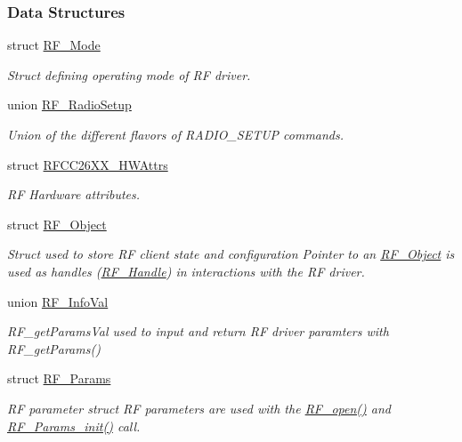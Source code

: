 \subsubsection*{Data Structures}
\begin{DoxyCompactItemize}
\item 
struct \hyperlink{struct_r_f___mode}{R\+F\+\_\+\+Mode}
\begin{DoxyCompactList}\small\item\em Struct defining operating mode of R\+F driver. \end{DoxyCompactList}\item 
union \hyperlink{union_r_f___radio_setup}{R\+F\+\_\+\+Radio\+Setup}
\begin{DoxyCompactList}\small\item\em Union of the different flavors of R\+A\+D\+I\+O\+\_\+\+S\+E\+T\+U\+P commands. \end{DoxyCompactList}\item 
struct \hyperlink{struct_r_f_c_c26_x_x___h_w_attrs}{R\+F\+C\+C26\+X\+X\+\_\+\+H\+W\+Attrs}
\begin{DoxyCompactList}\small\item\em R\+F Hardware attributes. \end{DoxyCompactList}\item 
struct \hyperlink{struct_r_f___object}{R\+F\+\_\+\+Object}
\begin{DoxyCompactList}\small\item\em Struct used to store R\+F client state and configuration Pointer to an \hyperlink{struct_r_f___object}{R\+F\+\_\+\+Object} is used as handles (\hyperlink{_r_f_8h_a5e8ab7fc87fb818f435d9b6226ee573f}{R\+F\+\_\+\+Handle}) in interactions with the R\+F driver. \end{DoxyCompactList}\item 
union \hyperlink{union_r_f___info_val}{R\+F\+\_\+\+Info\+Val}
\begin{DoxyCompactList}\small\item\em R\+F\+\_\+get\+Params\+Val used to input and return R\+F driver paramters with R\+F\+\_\+get\+Params() \end{DoxyCompactList}\item 
struct \hyperlink{struct_r_f___params}{R\+F\+\_\+\+Params}
\begin{DoxyCompactList}\small\item\em R\+F parameter struct R\+F parameters are used with the \hyperlink{_r_f_8h_a13a7c6f5a2b797e0aac18fecfaba6f64}{R\+F\+\_\+open()} and \hyperlink{_r_f_8h_ab956de3745437cb7a69c4edfb006434e}{R\+F\+\_\+\+Params\+\_\+init()} call. \end{DoxyCompactList}\item 

\end{DoxyCompactItemize}
